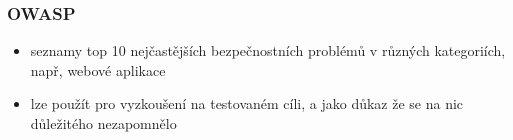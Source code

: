 \subsubsection*{OWASP}
\begin{itemize}
	\item seznamy top 10 nejčastějších bezpečnostních problémů v různých kategoriích, např, webové aplikace
	\item lze použít pro vyzkoušení na testovaném cíli, a jako důkaz že se na nic důležitého nezapomnělo
\end{itemize}